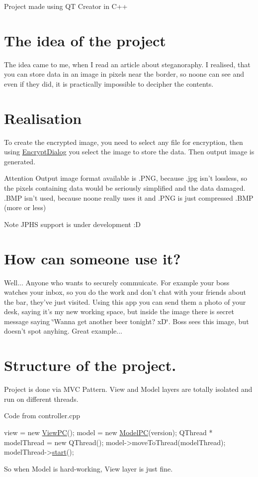 Project made using Q\-T Creator in C++\hypertarget{index_idea}{}\section{The idea of the project}\label{index_idea}
The idea came to me, when I read an article about steganoraphy. I realised, that you can store data in an image in pixels near the border, so noone can see and even if they did, it is practically impossible to decipher the contents. \hypertarget{index_real}{}\section{Realisation}\label{index_real}
To create the encrypted image, you need to select any file for encryption, then using \hyperlink{class_encrypt_dialog}{Encrypt\-Dialog} you select the image to store the data. Then output image is generated. \begin{DoxyAttention}{Attention}
Output image format available is .P\-N\-G, because .jpg isn't lossless, so the pixels containing data would be seriously simplified and the data damaged. .B\-M\-P isn't used, because noone really uses it and .P\-N\-G is just compressed .B\-M\-P (more or less) 
\end{DoxyAttention}
\begin{DoxyNote}{Note}
J\-P\-H\-S support is under development \-:D
\end{DoxyNote}
\hypertarget{index_use}{}\section{How can someone use it?}\label{index_use}
Well... Anyone who wants to securely commuicate. For example your boss watches your inbox, so you do the work and don't chat with your friends about the bar, they've just visited. Using this app you can send them a photo of your desk, saying it's my new working space, but inside the image there is secret message saying \char`\"{}\-Wanna get another beer tonight? x\-D\char`\"{}. Boss sees this image, but doesn't spot anyhing. Great example... \hypertarget{index_structure}{}\section{Structure of the project.}\label{index_structure}
Project is done via M\-V\-C Pattern. View and Model layers are totally isolated and run on different threads.

Code from controller.\-cpp 
\begin{DoxyCode}
view = \textcolor{keyword}{new} \hyperlink{class_view_p_c}{ViewPC}();
model = \textcolor{keyword}{new} \hyperlink{class_model_p_c}{ModelPC}(version);
QThread * modelThread = \textcolor{keyword}{new} QThread();
model->moveToThread(modelThread);
modelThread->\hyperlink{class_model_p_c_a3cae34fd5bcb06e8c1f8cfe7961bd270}{start}();
\end{DoxyCode}
 So when Model is hard-\/working, View layer is just fine.

